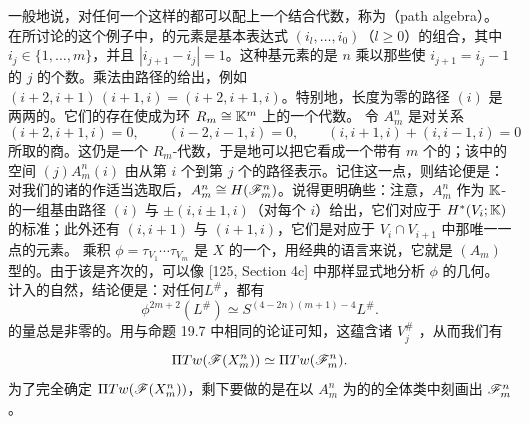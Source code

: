 一般地说，对任何一个这样的\trQuiver{}都可以配上一个\trGraded{}结合代数，称为\textbf{\trPathAlgebra}（path algebra）。在所讨论的这个例子中，\trPathAlgebra{}的元素是基本表达式 $(i_l,\ldots,i_0)$（$l\ge 0$）的\trLinear{}组合，其中 $i_j\in\{1,\ldots,m\}$，并且 $|i_{j+1}-i_j|=1$。这种基元素的\trDegree{}是 $n$ 乘以那些使 $i_{j+1}=i_j-1$ 的 $j$ 的个数。乘法由路径的\trComposition{}给出，例如 $(i+2,i+1)\,(i+1,i)=(i+2,i+1,i)$。特别地，长度为零的路径 $(i)$ 是两两\trOrthogonal{}的\trIdempotent。它们的存在使\trPathAlgebra{}成为\trSemisimple{}环 $R_m\cong\mathbb{K}^m$ 上的一个代数。
令 $A^n_m$ 是\trPathAlgebra{}对关系
\begin{equation*}
(i+2,i+1,i)=0,\qquad (i-2,i-1,i)=0,\qquad (i,i+1,i)+(i,i-1,i)=0
\end{equation*}
所取的商。这仍是一个\trGraded{} $R_m$-代数，于是\trEquivalence{}地可以把它看成一个带有 $m$ 个\trObject{}的\trGraded\trLinear\trCategory；该\trCategory{}中的\trMorphism{}空间 $(j)A^n_m(i)$ 由从第 $i$ 个\trVertex{}到第 $j$ 个\trVertex{}的路径表示。记住这一点，则结论便是：对我们的诸\trVanishingCycle{}的\trGrading{}作适当选取后，$A^n_m\cong H(\mathscr{F}^n_m)$。说得更明确些：注意，$A^n_m$ 作为 $\mathbb{K}$-\trVectorSpace{}的一组基由路径 $(i)$ 与 $\pm(i,i\pm 1,i)$（对每个 $i$）给出，它们对应于 $H^*(V_i;\mathbb{K})$ 的标准\trGenerator{}；此外还有 $(i,i+1)$ 与 $(i+1,i)$，它们是对应于 $V_i\cap V_{i+1}$ 中那唯一一点的\trFloer{}元素。
乘积 $\phi=\tau_{V_1}\cdots\tau_{V_m}$ 是 $X$ 的一个\trSymplectic\trAutomorphism，用经典的语言来说，它就是 $(A_m)$ 型\trHypersurface\trSingularPoint{}的\trMonodromy。由于该\trSingularPoint{}是\trWeighted{}齐次的，可以像 [125, Section 4c] 中那样显式地分析 $\phi$ 的几何。计入\trDehnTwist{}的自然\trGrading，结论便是：对任何\trExactLagrangianBrane{}$L^\#$，都有
\begin{equation*}
\phi^{2m+2}(L^\#)\simeq S^{(4-2n)(m+1)-4}L^\#.
\end{equation*}
\trSuspension{}的量总是非零的。用与命题 19.7 中相同的论证可知，这蕴含诸 $V_j^\#$ \trSplitGeneration\trFukayaCategory，从而我们有\trQuasiequivalence
\begin{equation}\label{eq:tw-quasi-equivalence}
\Pi Tw(\mathscr{F}(X^n_m))\simeq\Pi Tw(\mathscr{F}^n_m).
\end{equation}
为了完全确定 $\Pi Tw(\mathscr{F}(X^n_m))$，剩下要做的是在以 $A^n_m$ 为\trCohomology{}的\trACategory{}的全体\trQuasiisomorphism{}类中刻画出 $\mathscr{F}^n_m$。
